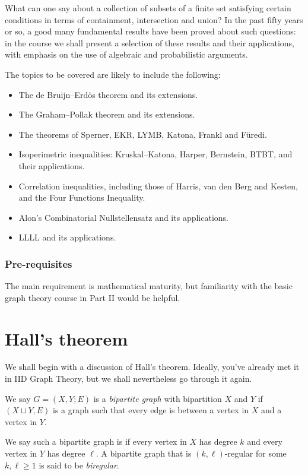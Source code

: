 \documentclass[a4paper]{article}
\begin{document}
\maketitle
{\small
\setlength{\parindent}{0em}
\setlength{\parskip}{1em}

What can one say about a collection of subsets of a finite set satisfying certain conditions in terms of containment, intersection and union? In the past fifty years or so, a good many fundamental results have been proved about such questions: in the course we shall present a selection of these results and their applications, with emphasis on the use of algebraic and probabilistic arguments.

The topics to be covered are likely to include the following:
\begin{itemize}
  \item The de Bruijn--Erd\"os theorem and its extensions.
  \item The Graham--Pollak theorem and its extensions.
  \item The theorems of Sperner, EKR, LYMB, Katona, Frankl and F\"uredi. %
  \item Isoperimetric inequalities: Kruskal--Katona, Harper, Bernstein, BTBT, and their applications.
  \item Correlation inequalities, including those of Harris, van den Berg and Kesten, and the Four Functions Inequality.
  \item Alon's Combinatorial Nullstellensatz and its applications.
  \item LLLL and its applications.
\end{itemize}

\subsubsection*{Pre-requisites}
The main requirement is mathematical maturity, but familiarity with the basic graph theory course in Part II would be helpful.
}
\tableofcontents

\section{Hall's theorem}
We shall begin with a discussion of Hall's theorem. Ideally, you've already met it in IID Graph Theory, but we shall nevertheless go through it again.

\begin{defi}
  We say $G = (X, Y; E)$ is a \emph{bipartite graph} with bipartition $X$ and $Y$ if $(X \sqcup Y, E)$ is a graph such that every edge is between a vertex in $X$ and a vertex in $Y$.

  We say such a bipartite graph is  if every vertex in $X$ has degree $k$ and every vertex in $Y$ has degree $\ell$. A bipartite graph that is $(k, \ell)$-regular for some $k, \ell \geq 1$ is said to be \emph{biregular}.
\end{defi}
\end{document}
